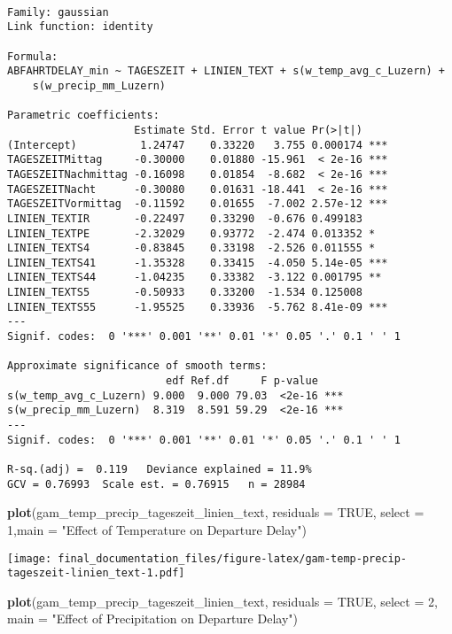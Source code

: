 \documentclass[
]{article}
\newenvironment{Shaded}{\begin{snugshade}}{\end{snugshade}}
\newcommand{\AttributeTok}[1]{\textcolor[rgb]{0.13,0.29,0.53}{#1}}
\newcommand{\ConstantTok}[1]{\textcolor[rgb]{0.56,0.35,0.01}{#1}}
\newcommand{\DecValTok}[1]{\textcolor[rgb]{0.00,0.00,0.81}{#1}}
\newcommand{\FunctionTok}[1]{\textcolor[rgb]{0.13,0.29,0.53}{\textbf{#1}}}
\newcommand{\NormalTok}[1]{#1}
\newcommand{\StringTok}[1]{\textcolor[rgb]{0.31,0.60,0.02}{#1}}
\begin{document}
\begin{verbatim}

Family: gaussian 
Link function: identity 

Formula:
ABFAHRTDELAY_min ~ TAGESZEIT + LINIEN_TEXT + s(w_temp_avg_c_Luzern) + 
    s(w_precip_mm_Luzern)

Parametric coefficients:
                    Estimate Std. Error t value Pr(>|t|)    
(Intercept)          1.24747    0.33220   3.755 0.000174 ***
TAGESZEITMittag     -0.30000    0.01880 -15.961  < 2e-16 ***
TAGESZEITNachmittag -0.16098    0.01854  -8.682  < 2e-16 ***
TAGESZEITNacht      -0.30080    0.01631 -18.441  < 2e-16 ***
TAGESZEITVormittag  -0.11592    0.01655  -7.002 2.57e-12 ***
LINIEN_TEXTIR       -0.22497    0.33290  -0.676 0.499183    
LINIEN_TEXTPE       -2.32029    0.93772  -2.474 0.013352 *  
LINIEN_TEXTS4       -0.83845    0.33198  -2.526 0.011555 *  
LINIEN_TEXTS41      -1.35328    0.33415  -4.050 5.14e-05 ***
LINIEN_TEXTS44      -1.04235    0.33382  -3.122 0.001795 ** 
LINIEN_TEXTS5       -0.50933    0.33200  -1.534 0.125008    
LINIEN_TEXTS55      -1.95525    0.33936  -5.762 8.41e-09 ***
---
Signif. codes:  0 '***' 0.001 '**' 0.01 '*' 0.05 '.' 0.1 ' ' 1

Approximate significance of smooth terms:
                         edf Ref.df     F p-value    
s(w_temp_avg_c_Luzern) 9.000  9.000 79.03  <2e-16 ***
s(w_precip_mm_Luzern)  8.319  8.591 59.29  <2e-16 ***
---
Signif. codes:  0 '***' 0.001 '**' 0.01 '*' 0.05 '.' 0.1 ' ' 1

R-sq.(adj) =  0.119   Deviance explained = 11.9%
GCV = 0.76993  Scale est. = 0.76915   n = 28984
\end{verbatim}

\begin{Shaded}
\begin{Highlighting}[]
\FunctionTok{plot}\NormalTok{(gam\_temp\_precip\_tageszeit\_linien\_text, }\AttributeTok{residuals =} \ConstantTok{TRUE}\NormalTok{, }\AttributeTok{select =} \DecValTok{1}\NormalTok{,}\AttributeTok{main =} \StringTok{"Effect of Temperature on Departure Delay"}\NormalTok{)}
\end{Highlighting}
\end{Shaded}

\texttt{[image: final\_documentation\_files/figure-latex/gam-temp-precip-tageszeit-linien\_text-1.pdf]}

\begin{Shaded}
\begin{Highlighting}[]
\FunctionTok{plot}\NormalTok{(gam\_temp\_precip\_tageszeit\_linien\_text, }\AttributeTok{residuals =} \ConstantTok{TRUE}\NormalTok{, }\AttributeTok{select =} \DecValTok{2}\NormalTok{, }\AttributeTok{main =} \StringTok{"Effect of Precipitation on Departure Delay"}\NormalTok{)}
\end{Highlighting}
\end{Shaded}
\end{document}
